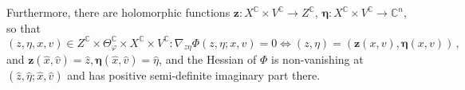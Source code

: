 \documentclass[
	fontsize=11pt, 
	twoside=false, 
	abstract=true, 
	a4paper,
]{scrartcl}
\newcommand{\sem}{\setminus\{0\}}
\newcommand{\RR}{\mathbb{R}}
\newcommand{\CC}{\mathbb{C}}
\newcommand{\abs}[1]{\left\lvert#1\right\rvert}
\newcommand{\del}{\partial}
\begin{document}
\begin{lemma}
	Furthermore, 
	there are holomorphic functions $\mathbf{z}\colon X^{\CC}\times V^{\CC} \to Z^{\CC}$, $\bm{\eta}\colon X^{\CC}\times V^{\CC} \to \CC^n$, so that
	\begin{equation}\label{eq:uniqsol}
		(z,\eta, x,v) \in Z^{\CC}\times \Theta^{\CC}_\varphi\times X^{\CC}\times V^{\CC}\colon \nabla_{z\eta}\Phi(z,\eta;x,v) = 0 \iff (z,\eta) = (\mathbf{z}(x,v),\bm{\eta}(x,v))\,,
	\end{equation}
	and $\mathbf{z}(\hat x, \hat v) = \hat z, \bm{\eta}(\hat x, \hat v) = \hat \eta$, and the Hessian of $\Phi$ is non-vanishing at $(\hat z, \hat \eta;\hat x, \hat v)$ and has positive semi-definite imaginary part there.%
\end{lemma}
\end{document}
